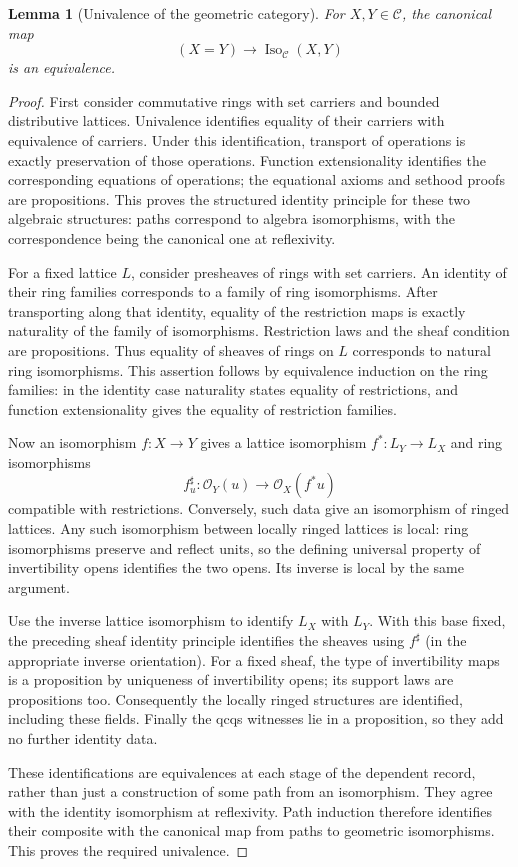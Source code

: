 \documentclass[11pt]{amsart}
\newtheorem{lemma}[theorem]{Lemma}
\theoremstyle{definition}\newtheorem{definition}[theorem]{Definition}
\theoremstyle{remark}\newtheorem{remark}[theorem]{Remark}
\begin{document}
\begin{lemma}[Univalence of the geometric category]
For $X,Y\in\mathcal C$, the canonical map
\[
 (X=Y)\longrightarrow\operatorname{Iso}_{\mathcal C}(X,Y)
\]
is an equivalence.
\end{lemma}
\begin{proof}
First consider commutative rings with set carriers and bounded
distributive lattices. Univalence identifies equality of their carriers
with equivalence of carriers. Under this identification, transport of
operations is exactly preservation of those operations. Function
extensionality identifies the corresponding equations of operations;
the equational axioms and sethood proofs are propositions. This proves
the structured identity principle for these two algebraic structures:
paths correspond to algebra isomorphisms, with the correspondence being
the canonical one at reflexivity.

For a fixed lattice $L$, consider presheaves of rings with set carriers.
An identity of their ring families corresponds to a family of ring
isomorphisms. After transporting along that identity, equality of the
restriction maps is exactly naturality of the family of isomorphisms.
Restriction laws and the sheaf condition are propositions. Thus equality
of sheaves of rings on $L$ corresponds to natural ring isomorphisms.
This assertion follows by equivalence induction on the ring families:
in the identity case naturality states equality of restrictions, and
function extensionality gives the equality of restriction families.

Now an isomorphism $f:X\to Y$ gives a lattice isomorphism
$f^*:L_Y\to L_X$ and ring isomorphisms
\[
 f^\sharp_u:\mathcal O_Y(u)\longrightarrow
                  \mathcal O_X(f^*u)
\]
compatible with restrictions. Conversely, such data give an isomorphism
of ringed lattices. Any such isomorphism between locally ringed lattices
is local: ring isomorphisms preserve and reflect units, so the defining
universal property of invertibility opens identifies the two opens.
Its inverse is local by the same argument.

Use the inverse lattice isomorphism to identify $L_X$ with $L_Y$.
With this base fixed, the preceding sheaf identity principle identifies
the sheaves using $f^\sharp$ (in the appropriate inverse orientation).
For a fixed sheaf, the type of invertibility maps is a proposition by
uniqueness of invertibility opens; its support laws are propositions too.
Consequently the locally ringed structures are identified, including
these fields. Finally the qcqs witnesses lie in a proposition, so they
add no further identity data.

These identifications are equivalences at each stage of the dependent
record, rather than just a construction of some path from an isomorphism.
They agree with the identity isomorphism at reflexivity. Path induction
therefore identifies their composite with the canonical map from paths
to geometric isomorphisms. This proves the required univalence.
\end{proof}
\end{document}
